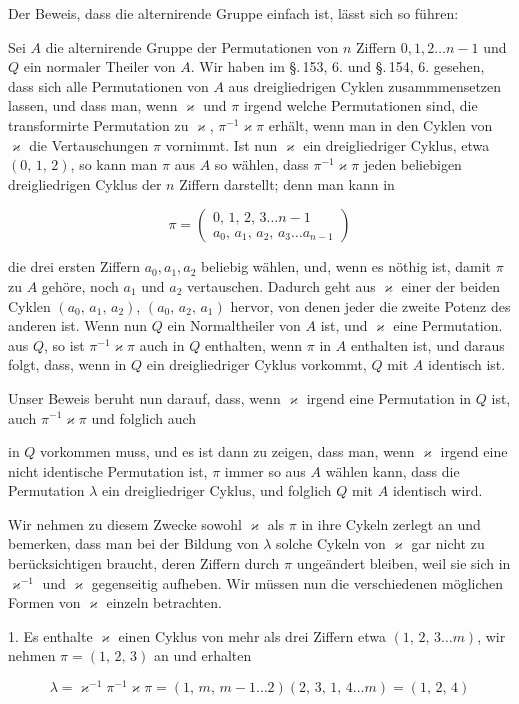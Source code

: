 
Der Beweis, dass die alternirende Gruppe einfach ist, lässt sich so führen:

Sei $A$ die alternirende Gruppe der Permutationen von $n$ Ziffern $0, 1, 2 \ldots n-1$ und $Q$ ein normaler Theiler von $A$. Wir haben im \S.\,153, 6. und \S.\,154, 6. gesehen, dass sich alle Permutationen von $A$ aus dreigliedrigen Cyklen zusammmensetzen lassen, und dass man, wenn $\varkappa$ und $\pi$ irgend welche Permutationen sind, die transformirte Permutation zu $\varkappa$, $\pi^{-1}\varkappa\pi$ erhält, wenn man in den Cyklen von $\varkappa$ die Vertauschungen $\pi$ vornimmt. Ist nun $\varkappa$ ein dreigliedriger Cyklus, etwa $(0,\,1,\,2)$, so kann man $\pi$ aus $A$ so wählen, dass $\pi^{-1}\varkappa\pi$ jeden beliebigen dreigliedrigen Cyklus der $n$ Ziffern darstellt; denn man kann in

\[
\pi = \begin{pmatrix} 0,\,1,\,2,\,3 \ldots n-1 \\ a_0,\,a_1,\,a_2,\,a_3 \ldots a_{n-1} \end{pmatrix}
\]

die drei ersten Ziffern $a_0, a_1, a_2$ beliebig wählen, und, wenn es n\"othig ist, damit $\pi$ zu $A$ gehöre, noch $a_1$ und $a_2$ vertauschen. Dadurch geht aus $\varkappa$ einer der beiden Cyklen $(a_0,\,a_1,\,a_2)$, $(a_0,\,a_2,\,a_1)$ hervor, von denen jeder die zweite Potenz des anderen ist. Wenn nun $Q$ ein Normaltheiler von $A$ ist, und $\varkappa$ eine Permutation. aus $Q$, so ist $\pi^{-1}\varkappa\pi$ auch in $Q$ enthalten, wenn $\pi$ in $A$ enthalten ist, und daraus folgt, dass, wenn in $Q$ ein dreigliedriger Cyklus vorkommt, $Q$ mit $A$ identisch ist.

Unser Beweis beruht nun darauf, dass, wenn $\varkappa$ irgend eine Permutation in $Q$ ist, auch $\pi^{-1}\varkappa\pi$ und folglich auch


in $Q$ vorkommen muss, und es ist dann zu zeigen, dass man, wenn $\varkappa$ irgend eine nicht identische Permutation ist, $\pi$ immer so aus $A$ wählen kann, dass die Permutation $\lambda$ ein dreigliedriger Cyklus, und folglich $Q$ mit $A$ identisch wird.

Wir nehmen zu diesem Zwecke sowohl $\varkappa$ als $\pi$ in ihre Cykeln zerlegt an und bemerken, dass man bei der Bildung von $\lambda$ solche Cykeln von $\varkappa$ gar nicht zu berücksichtigen braucht, deren Ziffern durch $\pi$ ungeändert bleiben, weil sie sich in $\varkappa^{-1}$ und $\varkappa$ gegenseitig aufheben. Wir müssen nun die verschiedenen möglichen Formen von $\varkappa$ einzeln betrachten.

1. Es enthalte $\varkappa$ einen Cyklus von mehr als drei Ziffern etwa $(1,\,2,\,3 \ldots m)$, wir nehmen $\pi = (1,\,2,\,3)$ an und erhalten

\[
\lambda = \varkappa^{-1}\pi^{-1}\varkappa\pi = (1,\,m,\,m-1 \ldots 2)(2,\,3,\,1,\,4 \ldots m) = (1,\,2,\,4)
\]
